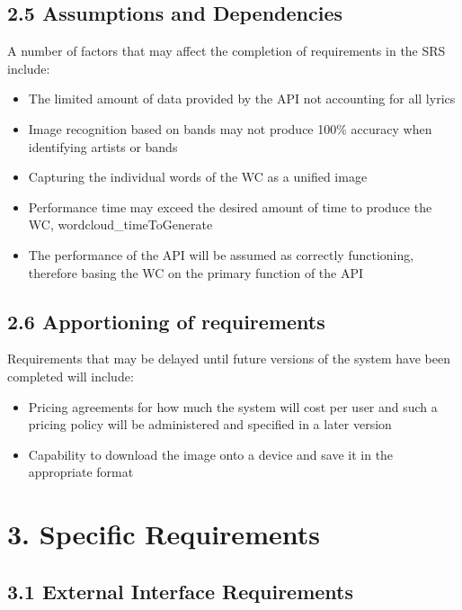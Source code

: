 \documentclass[]{article}
\begin{document}
\subsection{2.5 Assumptions and
Dependencies}\label{assumptions-and-dependencies}

A number of factors that may affect the completion of requirements in
the SRS include:

\begin{itemize}
\itemsep1pt\parskip0pt
\item
  The limited amount of data provided by the API not accounting for all
  lyrics
\item
  Image recognition based on bands may not produce 100\% accuracy when
  identifying artists or bands
\item
  Capturing the individual words of the WC as a unified image
\item
  Performance time may exceed the desired amount of time to produce the
  WC, wordcloud\_timeToGenerate
\item
  The performance of the API will be assumed as correctly functioning,
  therefore basing the WC on the primary function of the API
\end{itemize}

\subsection{2.6 Apportioning of
requirements}\label{apportioning-of-requirements}

Requirements that may be delayed until future versions of the system
have been completed will include:

\begin{itemize}
\itemsep1pt\parskip0pt
\item
  Pricing agreements for how much the system will cost per user and such
  a pricing policy will be administered and specified in a later version
\item
  Capability to download the image onto a device and save it in the
  appropriate format
\end{itemize}

\section{3. Specific Requirements}\label{specific-requirements}

\subsection{3.1 External Interface
Requirements}\label{external-interface-requirements}
\end{document}
